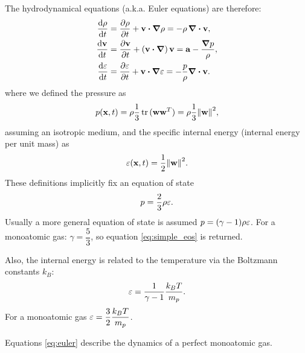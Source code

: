 The hydrodynamical equations (a.k.a. Euler equations) are therefore:
\begin{align}
\label{eq:euler}
 \dv{\rho}{t} &= \pdv{\rho}{t} + \vect{v} \vdot \grad \rho = - \rho \,\div \vect{v}, \nonumber\\
 \dv{\vect{v}}{t} &= \pdv{\vect{v}}{t} + \left(\vect{v} \vdot \grad\right) \vect{v}  = \vect a - \frac{\grad p}{\rho},\\
 \dv{\energy}{t} &= \pdv{\energy}{t} + \vect{v} \vdot \grad \energy = - \frac{p}{\rho} \div \vect{v}. \nonumber%
\end{align}
where we defined the pressure as $$p(\vect x, t) = \rho \dfrac 1 3 \trace{(\vect w \vect w^T)} = \rho \dfrac 1 3 \norm{\vect w}^2,$$ assuming an isotropic medium, and the specific internal energy (internal energy per unit mass) as $$\varepsilon(\boldsymbol{\mathbf{x}}, t)=\dfrac 1 2 \norm{\boldsymbol{\mathbf{w}}}^2.$$ %
These definitions implicitly fix an equation of state
\begin{equation}
\label{eq:simple_eos}
p = \frac 2 3 \rho \varepsilon.
\end{equation}
Usually a more general equation of state is assumed $p = (\gamma - 1) \rho \varepsilon$.
For a monoatomic gas: $\gamma = \dfrac{5}{3}$, so equation \eqref{eq:simple_eos} is returned.

Also, the internal energy is related to the temperature via the Boltzmann constants $k_B$:
\[ \varepsilon = \frac {1}{\gamma - 1} \frac{k_B T}{m_p}.\]
For a monoatomic gas $\displaystyle \varepsilon = \frac 3 2 \frac{k_B T}{m_p}$.


Equations \eqref{eq:euler} describe the dynamics of a perfect monoatomic gas.

